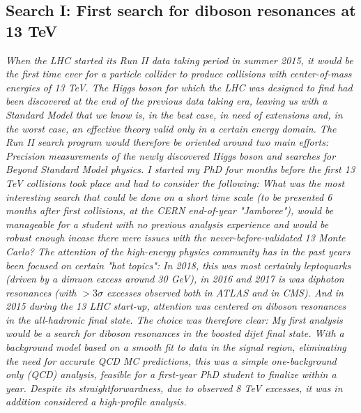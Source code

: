\begin{singlespace}
\begin{centering}
\section{Search I: First search for diboson resonances at 13 TeV}
\label{searchI}
\textit{
When the LHC started its Run II data taking period in summer 2015, it would be the first time ever for a particle collider to produce collisions with center-of-mass energies of 13 TeV. The Higgs boson for which the LHC was designed to find had been discovered at the end of the previous data taking era, leaving us with a Standard Model that we know is, in the best case, in need of extensions and, in the worst case, an effective theory valid only in a certain energy domain. The Run II search program would therefore be oriented around two main efforts: Precision measurements of the newly discovered Higgs boson and searches for Beyond Standard Model physics.
\newline
\newline
I started my PhD four months before the first 13 TeV collisions took place and had to consider the following:
What was the most interesting search that could be done on a short time scale (to be presented 6 months after first collisions, at the CERN end-of-year "Jamboree"), would be manageable for a student with no previous analysis experience and would be robust enough incase there were issues with the never-before-validated 13 \TeV Monte Carlo?
\newline
\newline
The attention of the high-energy physics community has in the past years been focused on certain "hot topics": In 2018, this was most certainly leptoquarks (driven by a dimuon excess around 30 GeV), in 2016 and 2017 is was diphoton resonances (with  $>3\sigma$ excesses observed both in ATLAS and in CMS). And in 2015 during the 13 \TeV LHC start-up, attention was centered on diboson resonances in the all-hadronic final state. The choice was therefore clear: My first analysis would be a search for diboson resonances in the boosted dijet final state. With a background model based on a smooth fit to data in the signal region, eliminating the need for accurate QCD MC predictions, this was a simple one-background only (QCD) analysis, feasible for a first-year PhD student to finalize within a year. Despite its straightforwardness, due to observed 8 TeV excesses, it was in addition considered a high-profile analysis.
}
\end{centering}
\end{singlespace}
